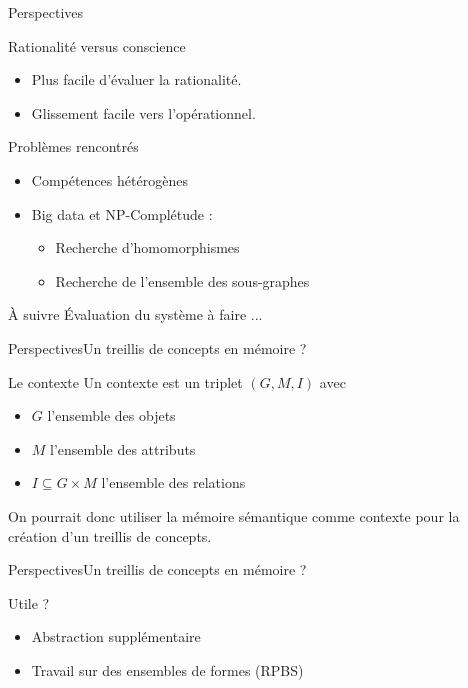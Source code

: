 \begin{frame}{Perspectives}

\begin{block}{Rationalité versus conscience}
\begin{itemize}
\item Plus facile d'évaluer la rationalité.
\item Glissement facile vers l'opérationnel.
\end{itemize}
\end{block}

\pause

\begin{block}{Problèmes rencontrés}
\begin{itemize}
\item Compétences hétérogènes
\item Big data et NP-Complétude :
\begin{itemize}
\item Recherche d'homomorphismes
\item Recherche de l'ensemble des sous-graphes
\end{itemize}
\end{itemize}
\end{block}

\pause

\begin{block}{À suivre}
Évaluation du système à faire ...
\end{block}

\end{frame}

\begin{frame}{Perspectives}{Un treillis de concepts en mémoire ?}
\begin{block}{Le contexte}
Un contexte est un triplet $(G,M,I)$ avec
\begin{itemize}
\item $G$ l'ensemble des objets
\item $M$ l'ensemble des attributs
\item $I \subseteq G \times M$ l'ensemble des relations
\end{itemize}
On pourrait donc utiliser la mémoire sémantique comme contexte pour la création d'un treillis de concepts.
\end{block}
\end{frame}

\begin{frame}{Perspectives}{Un treillis de concepts en mémoire ?}
\begin{block}{Utile ?}
\begin{itemize}
\item Abstraction supplémentaire
\item Travail sur des ensembles de formes (RPBS)
\end{itemize}
\end{block}
\end{frame}


